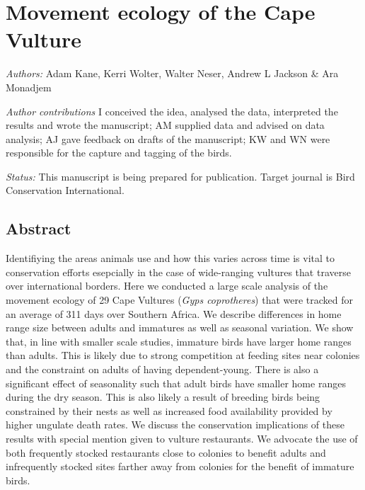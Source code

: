 


\chapter{Movement ecology of the Cape Vulture}
\label{chap:introduction}

\textit{Authors:} Adam Kane, Kerri Wolter, Walter Neser, Andrew L Jackson \& Ara Monadjem

\vspace{10 mm}
\noindent
\textit{\uppercase{A}uthor contributions}
I conceived the idea, analysed the data, interpreted the results and wrote the manuscript;
AM supplied data and advised on data analysis; 
AJ gave feedback on drafts of the manuscript;
KW and WN were responsible for the capture and tagging of the birds. 

\vspace{10 mm}

\noindent
\textit{Status:} This manuscript is being prepared for publication. Target journal is Bird Conservation International.

\newpage


\noindent

\section{\uppercase{A}bstract}

	Identifiying the areas animals use and how this varies across time is vital to conservation efforts esepcially in the case of wide-ranging vultures that traverse over international borders. Here we conducted a large scale analysis of the movement ecology of 29 Cape Vultures (\textit{Gyps coprotheres}) that were tracked for an average of 311 days over Southern Africa. We describe differences in home range size between adults and immatures as well as seasonal variation. We show that, in line with smaller scale studies, immature birds have larger home ranges than adults. This is likely due to strong competition at feeding sites near colonies and the constraint on adults of having dependent-young. There is also a significant effect of seasonality such that adult birds have smaller home ranges during the dry season. This is also likely a result of breeding birds being constrained by their nests as well as increased food availability provided by higher ungulate death rates. We discuss the conservation implications of these results with special mention given to vulture restaurants. We advocate the use of both frequently stocked restaurants close to colonies to benefit adults and infrequently stocked sites farther away from colonies for the benefit of immature birds. 
\newpage

